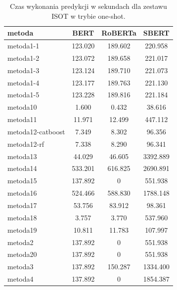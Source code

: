 \begin{table}[H]
	\centering
	\caption{Czas wykonania predykcji w sekundach dla zestawu ISOT w trybie one-shot.}
	\label{tab:execution_time_one_shot_isot}
	\small
	\begin{tabular}{lccc}
		\toprule
		\textbf{metoda}   & \textbf{BERT} & \textbf{RoBERTa} & \textbf{SBERT} \\
		\midrule
		metoda1-1         & 123.020       & 189.602          & 220.958        \\
		metoda1-2         & 123.072       & 189.658          & 221.017        \\
		metoda1-3         & 123.124       & 189.710          & 221.073        \\
		metoda1-4         & 123.177       & 189.763          & 221.130        \\
		metoda1-5         & 123.228       & 189.816          & 221.184        \\
		metoda10          & 1.600         & 0.432            & 38.616         \\
		metoda11          & 11.971        & 12.499           & 447.112        \\
		metoda12-catboost & 7.349         & 8.302            & 96.356         \\
		metoda12-rf       & 7.338         & 8.290            & 96.341         \\
		metoda13          & 44.029        & 46.605           & 3392.889       \\
		metoda14          & 533.201       & 616.825          & 2690.891       \\
		metoda15          & 137.892       &   0              & 551.938        \\
		metoda16          & 524.466       & 588.830          & 1788.148       \\
		metoda17          & 53.756        & 83.912           & 98.361         \\
		metoda18          & 3.757         & 3.770            & 537.960        \\
		metoda19          & 10.811        & 11.783           & 107.997        \\
		metoda2           & 137.892       &   0              & 551.938        \\
		metoda20          & 137.892       &   0              & 551.938        \\
		metoda3           & 137.892       & 150.287          & 1334.400       \\
		metoda4           & 137.892       &   0              & 1854.387       \\

\end{tabular}
\end{table}
